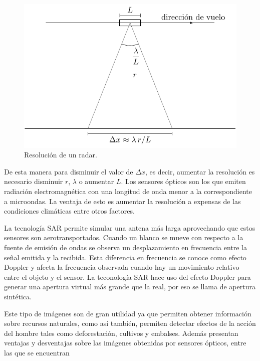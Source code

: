 \begin{figure}[hbt]
	\centering    
	\includegraphics[scale=1]{../../Figures/Tesis/Capitulo3/Resolucion.pdf}
	\caption{\label{Resolucion}Resolución de un radar.}
\end{figure} 

De esta manera para disminuir el valor de $\Delta x$, es decir, aumentar la resolución es necesario disminuir $r$, $\lambda$ o aumentar $L$. Los sensores ópticos son los que emiten radiación electromagnética con una longitud de onda menor a la correspondiente a microondas. La ventaja de esto es aumentar la resolución a expensas de las condiciones climáticas entre otros factores.

La tecnología SAR permite simular una antena más larga aprovechando que estos sensores son aerotransportados. Cuando un blanco se mueve con respecto a la fuente de emisión de ondas se observa un desplazamiento en frecuencia entre la señal emitida y la recibida. Esta diferencia en frecuencia se conoce como efecto Doppler y afecta la frecuencia observada cuando hay un movimiento relativo entre el objeto y el sensor. La teconología SAR hace uso del efecto Doppler para generar una apertura virtual más grande que la real, por eso se llama de apertura sintética.

Este tipo de imágenes son de gran utilidad ya que permiten obtener información sobre recursos naturales, como así también, permiten detectar efectos de la acción del hombre tales como deforestación, cultivos y embalses. Además presentan ventajas y desventajas sobre las imágenes obtenidas por sensores ópticos, entre las que se encuentran 

\medskip

